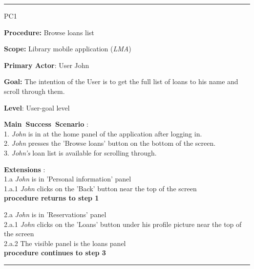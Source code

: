 \vspace{0.5cm}
\hrule
\begin{lyxlist}{PC1}
\small{
\item [\textbf{Procedure:}] Browse loans list
\item [\textbf{Scope:}] Library mobile application (\emph{LMA})
\item [\textbf{Primary Actor}:] User John
\item [\textbf{Goal:}] The intention of the User is to get the full list of
loans to his name and scroll through them.
\item [\textbf{Level}:] User-goal level
\item [\textbf{Main~Success~Scenario}]:\\
1. \emph{John} is in at the home panel of the application after logging in.\\
2. \emph{John} presses the 'Browse loans' button on the bottom of the screen.\\
3. \emph{John's} loan list is available for scrolling through.\\

\item [\textbf{Extensions}]:\\
1.a \emph{John} is in 'Personal information' panel\\
\hspace*{0.5cm} 1.a.1 \emph{John} clicks on the 'Back' button near the top of
the screen\\
\hspace*{0.5cm} \textbf{procedure returns to step 1}

2.a \emph{John} is in 'Reservations' panel\\
\hspace*{0.5cm} 2.a.1 \emph{John} clicks on the 'Loans' button under his
profile picture near the top of the screen\\
\hspace*{0.5cm} 2.a.2 The visible panel is the loans panel\\
\hspace*{0.5cm} \textbf{procedure continues to step 3}

}

\end{lyxlist}
\hrule


